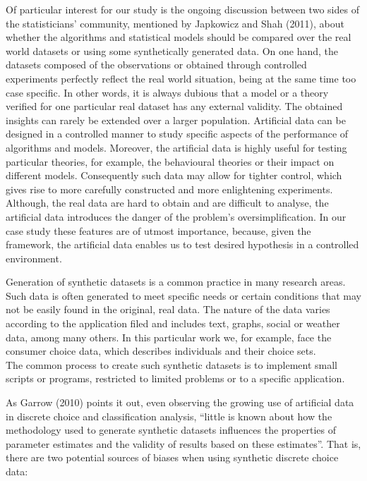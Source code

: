 \documentclass[12pt,]{article}
\begin{document}
Of particular interest for our study is the ongoing discussion between
two sides of the statisticians' community, mentioned by Japkowicz and
Shah (2011), about whether the algorithms and statistical models should
be compared over the real world datasets or using some synthetically
generated data. On one hand, the datasets composed of the observations
or obtained through controlled experiments perfectly reflect the real
world situation, being at the same time too case specific. In other
words, it is always dubious that a model or a theory verified for one
particular real dataset has any external validity. The obtained insights
can rarely be extended over a larger population. Artificial data can be
designed in a controlled manner to study specific aspects of the
performance of algorithms and models. Moreover, the artificial data is
highly useful for testing particular theories, for example, the
behavioural theories or their impact on different models. Consequently
such data may allow for tighter control, which gives rise to more
carefully constructed and more enlightening experiments. Although, the
real data are hard to obtain and are difficult to analyse, the
artificial data introduces the danger of the problem's
oversimplification. In our case study these features are of utmost
importance, because, given the framework, the artificial data enables us
to test desired hypothesis in a controlled environment.

Generation of synthetic datasets is a common practice in many research
areas. Such data is often generated to meet specific needs or certain
conditions that may not be easily found in the original, real data. The
nature of the data varies according to the application filed and
includes text, graphs, social or weather data, among many others. In
this particular work we, for example, face the consumer choice data,
which describes individuals and their choice sets.\\
The common process to create such synthetic datasets is to implement
small scripts or programs, restricted to limited problems or to a
specific application.

As Garrow (2010) points it out, even observing the growing use of
artificial data in discrete choice and classification analysis, ``little
is known about how the methodology used to generate synthetic datasets
influences the properties of parameter estimates and the validity of
results based on these estimates''. That is, there are two potential
sources of biases when using synthetic discrete choice data:
\end{document}
